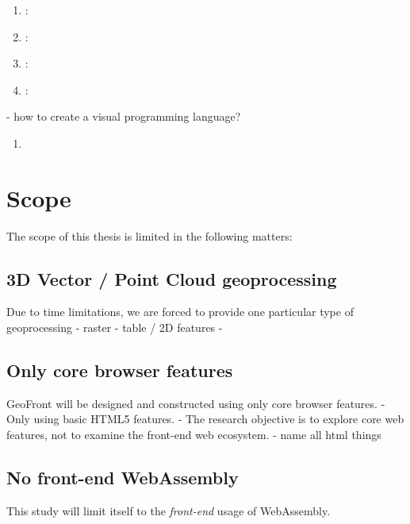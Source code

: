 \begin{enumerate}[a]
  \item {}: 
  \item {}:   
  \item {}: 
  \item {}:  
\end{enumerate}



- how to create a visual programming language?

\begin{enumerate}
  \item 
\end{enumerate}

\newpage
\section{Scope}
The scope of this thesis is limited in the following matters: 

\subsection{ 3D Vector / Point Cloud geoprocessing}
Due to time limitations, we are forced to provide one particular type of geoprocessing
- raster
- table / 2D features
- 


\subsection{ Only core browser features }
GeoFront will be designed and constructed using only core browser features. 
- Only using basic HTML5 features.
- The research objective is to explore core web features, not to examine the front-end web ecosystem. 
- name all html things



\subsection*{ No front-end WebAssembly } 
This study will limit itself to the \emph{front-end} usage of WebAssembly. 

